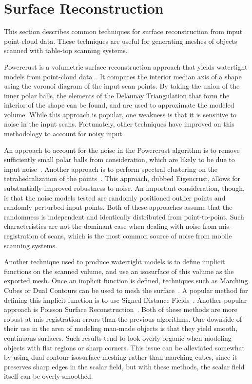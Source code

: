 \documentclass[12pt,onecolumn,oneside]{book}
\begin{document}
\section{Surface Reconstruction}
\label{sec:surf_recon_background}

This section describes common techniques for surface reconstruction from input point-cloud data.  These techniques are useful for generating meshes of objects scanned with table-top scanning systems.

Powercrust is a volumetric surface reconstruction approach that yields watertight models from point-cloud data~\cite{Powercrust}.  It computes the interior median axis of a shape using the voronoi diagram of the input scan points.  By taking the union of the inner polar balls, the elements of the Delaunay Triangulation that form the interior of the shape can be found, and are used to approximate the modeled volume.  While this approach is popular, one weakness is that it is sensitive to noise in the input scans.  Fortunately, other techniques have improved on this methodology to account for noisy input

An approach to account for the noise in the Powercrust algorithm is to remove sufficiently small polar balls from consideration, which are likely to be due to input noise~\cite{NoisyPowercrust}.  Another approach is to perform spectral clustering on the tetrahedralization of the points~\cite{EigencrustShewchuk}.  This approach, dubbed Eigencrust, allows for substantially improved robustness to noise.  An important consideration, though, is that the noise models tested are randomly positioned outlier points and randomly perturbed input points.  Both of these approaches assume that the randomness is independent and identically distributed from point-to-point.  Such characteristics are not the dominant case when dealing with noise from mis-registration of scans, which is the most common source of noise from mobile scanning systems.

Another technique used to produce watertight models is to define implicit functions on the scanned volume, and use an isosurface of this volume as the exported mesh.  Once an implicit function is defined, techniques such as Marching Cubes or Dual Contours can be used to mesh the surface~\cite{MarchingCubes,DualContouring}. A popular method for defining this implicit function is to use Signed-Distance Fields~\cite{SignedDistanceFields}.  Another popular approach is Poisson Surface Reconstruction~\cite{Poisson}.  Both of these methods are more robust at mis-registration errors than the previous algorithms.  One downside of their use in the area of modeling man-made objects is that they yield smooth, continuous surfaces.  Such results tend to look overly organic when modeling objects with flat regions or sharp corners.  This issue can be alleviated somewhat by using dual contour isosurface meshing rather than marching cubes, since it preserves sharp edges in the scalar field, but with these methods, the scalar field itself can be overly-smoothed.
\end{document}
